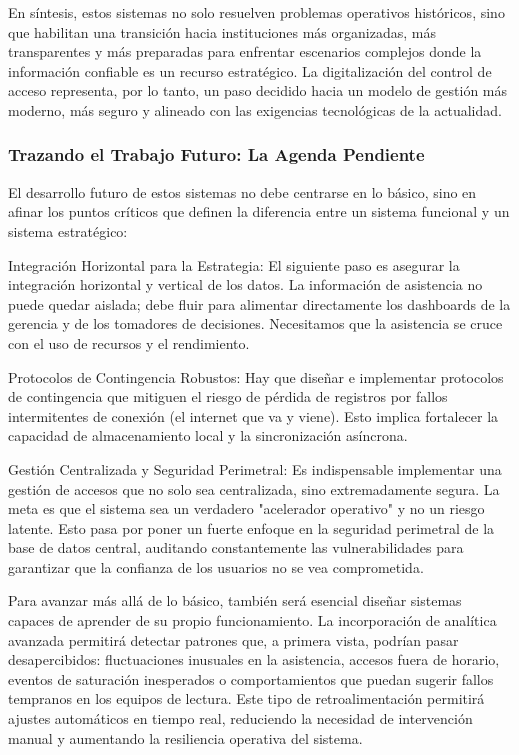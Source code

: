 En síntesis, estos sistemas no solo resuelven problemas operativos históricos, sino que habilitan una transición hacia instituciones más organizadas, más transparentes y más preparadas para enfrentar escenarios complejos donde la información confiable es un recurso estratégico. La digitalización del control de acceso representa, por lo tanto, un paso decidido hacia un modelo de gestión más moderno, más seguro y alineado con las exigencias tecnológicas de la actualidad.


\subsubsection*{ Trazando el Trabajo Futuro: La Agenda Pendiente}
El desarrollo futuro de estos sistemas no debe centrarse en lo básico, sino en afinar los puntos críticos que definen la diferencia entre un sistema funcional y un sistema estratégico:

Integración Horizontal para la Estrategia: El siguiente paso es asegurar la integración horizontal y vertical de los datos. La información de asistencia no puede quedar aislada; debe fluir para alimentar directamente los dashboards de la gerencia y de los tomadores de decisiones. Necesitamos que la asistencia se cruce con el uso de recursos y el rendimiento.

Protocolos de Contingencia Robustos: Hay que diseñar e implementar protocolos de contingencia que mitiguen el riesgo de pérdida de registros por fallos intermitentes de conexión (el internet que va y viene). Esto implica fortalecer la capacidad de almacenamiento local y la sincronización asíncrona.

Gestión Centralizada y Seguridad Perimetral: Es indispensable implementar una gestión de accesos que no solo sea centralizada, sino extremadamente segura. La meta es que el sistema sea un verdadero "acelerador operativo" y no un riesgo latente. Esto pasa por poner un fuerte enfoque en la seguridad perimetral de la base de datos central, auditando constantemente las vulnerabilidades para garantizar que la confianza de los usuarios no se vea comprometida.

Para avanzar más allá de lo básico, también será esencial diseñar sistemas capaces de aprender de su propio funcionamiento. La incorporación de analítica avanzada permitirá detectar patrones que, a primera vista, podrían pasar desapercibidos: fluctuaciones inusuales en la asistencia, accesos fuera de horario, eventos de saturación inesperados o comportamientos que puedan sugerir fallos tempranos en los equipos de lectura. Este tipo de retroalimentación permitirá ajustes automáticos en tiempo real, reduciendo la necesidad de intervención manual y aumentando la resiliencia operativa del sistema.

